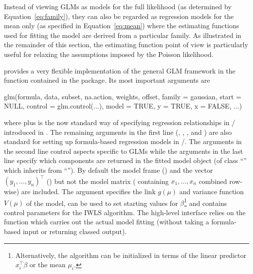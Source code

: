 \documentclass{Z}
\newcommand{\class}[1]{``\code{#1}''}
\newcommand{\fct}[1]{\code{#1()}}
\begin{document}
Instead of viewing GLMs as models for the full likelihood (as determined by
Equation~\ref{eq:family}), they can also be regarded as regression models for the
mean only (as specified in Equation~\ref{eq:mean}) where the estimating functions
used for fitting the model are derived from a particular family. As illustrated 
in the remainder of this section, the estimating function point of view is particularly
useful for relaxing the assumptions imposed by the Poisson likelihood.

 provides a very flexible implementation of the general GLM
framework in the function \fct{glm} \citep{countreg:Chambers+Hastie:1992}
contained in the  package. Its most important arguments are
\begin{Soutput}
glm(formula, data, subset, na.action, weights, offset,
  family = gaussian, start = NULL, control = glm.control(...),
  model = TRUE, y = TRUE, x = FALSE, ...)
\end{Soutput}
where  plus  is the now standard way of specifying
regression relationships in / introduced in
\cite{countreg:Chambers+Hastie:1992}. The remaining arguments in the first line
(, , , and ) are also standard 
for setting up formula-based regression models in /.
The arguments in the second line control aspects specific to GLMs while
the arguments in the last line specify which components are returned
in the fitted model object (of class \class{glm} which inherits from
\class{lm}). By default the model frame () and the vector
$(y_1, \dots, y_n)^\top$ () but not the model matrix (
containing $x_1, \dots, x_n$ combined row-wise) are included. The
 argument specifies the link $g(\mu)$ and variance
function $V(\mu)$ of the model,  can be used to set 
starting values for $\beta$\footnote{Alternatively, the algorithm can be
initialized in terms of the linear predictor $x_i^\top \beta$ or the mean
$\mu_i$.} and  contains control parameters for the IWLS
algorithm. The high-level \fct{glm} interface relies on the function	
\fct{glm.fit} which carries out the actual model fitting (without
taking a formula-based input or returning classed output).
\end{document}
